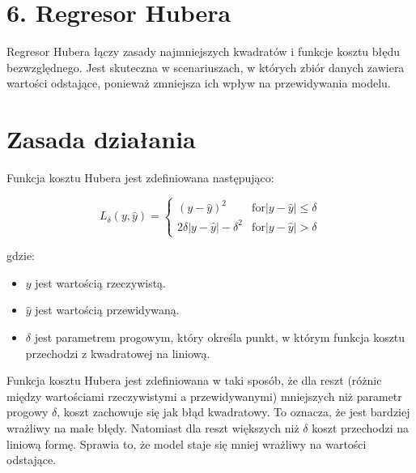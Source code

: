 {}
\justify
\fontsize{14}{16}\selectfont
\setlength{\parindent}{0pt}
\section*{6. Regresor Hubera \cite{huber1964robust}}
\fontsize{12}{14}\selectfont
\vspace{-1.0em}

Regresor Hubera łączy zasady najmniejszych kwadratów i funkcje kosztu błędu bezwzględnego. Jest skuteczna w scenariuszach, w których zbiór danych zawiera wartości odstające, ponieważ zmniejsza ich wpływ na przewidywania modelu. 

{}
\section*{Zasada działania \cite{hastie2009elements}}
\vspace{-1.0em}

Funkcja kosztu Hubera jest zdefiniowana następująco:

$$
L_\delta( y, \hat{y} ) = \begin{cases}
    ( y - \hat{y} )^2 & \text{for} | y - \hat{y} | \leq \delta \\
    2 \delta  | y - \hat{y} | - \delta^2  & \text{for} | y - \hat{y} | > \delta
\end{cases}
$$

gdzie:
\begin{itemize}
\setlength\itemsep{-0.5em}
\item $y$ jest wartością rzeczywistą.

 \item  $\hat{y}$ jest wartością przewidywaną.

 \item  $\delta$ jest parametrem progowym, który określa punkt, w którym funkcja kosztu przechodzi z kwadratowej na liniową.
\end{itemize}

Funkcja kosztu Hubera jest zdefiniowana w taki sposób, że dla reszt (różnic między wartościami rzeczywistymi a przewidywanymi) mniejszych niż parametr progowy $\delta$, koszt zachowuje się jak błąd kwadratowy. To oznacza, że jest bardziej wrażliwy na małe błędy. Natomiast dla reszt większych niż $\delta$ koszt przechodzi na liniową formę. Sprawia to, że model staje się mniej wrażliwy na wartości odstające. 

